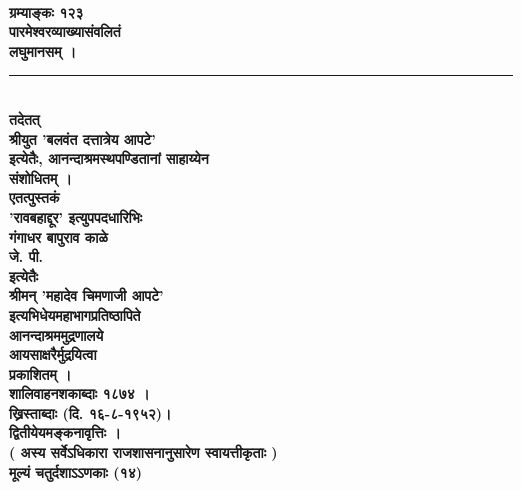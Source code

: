\documentclass[11pt, openany]{book}
\begin{document}
\thispagestyle{empty}
\begin{center}
\\
\vspace{2mm}
\textbf{ ग्रम्याङ्कः १२३}\\
\vspace{2mm}
\textbf{पारमेश्वरव्याख्यासंवलितं}\\
\vspace{3mm}
{\huge{\textbf{  लघुमानसम् ।}}}\\
\rule{0.3\linewidth}{1.0pt}\\
\vspace{2mm}
\textbf{तदेतत्}\\
\vspace{2mm}
\textbf{ श्रीयुत 'बलवंत दत्तात्रेय आपटे' }\\
\vspace{2mm}
\textbf{इत्येतैः, आनन्दाश्रमस्थपण्डितानां साहाय्येन}\\
\vspace{2mm}
\textbf{संशोधितम् ।}\\
\vspace{2mm}
\textbf{एतत्पुस्तकं}\\
\vspace{2mm}
\textbf{'रावबहाद्दूर' इत्युपपदधारिभिः}\\
\vspace{2mm}
\textbf{गंगाधर बापुराव काळे}\\
\vspace{2mm}
\textbf{जे. पी.}\\
\vspace{2mm}
\textbf{इत्येतैः}\\
\vspace{3mm}
{\huge{\textbf{श्रीमन् 'महादेव चिमणाजी आपटे'}}}\\
\vspace{2mm}
\textbf{इत्यभिधेयमहाभागप्रतिष्ठापिते}\\
\vspace{2mm}
{\huge{\textbf{आनन्दाश्रममुद्रणालये}}}\\
\vspace{2mm}
\textbf{आयसाक्षरैर्मुद्रयित्वा}\\
\vspace{2mm}
\textbf{प्रकाशितम् ।}\\
\vspace{2mm}
\textbf{शालिवाहनशकाब्दाः १८७४ ।}\\
\vspace{2mm}
\textbf{ख्रिस्ताब्दाः (दि. १६-८-१९५२)।}\\
\vspace{2mm}
\textbf{द्वितीयेयमङ्कनावृत्तिः ।}\\
 \vspace{2mm}
\textbf{( अस्य सर्वेऽधिकारा राजशासनानुसारेण स्वायत्तीकृताः   )}\\
\vspace{2mm}
\textbf{मूल्यं चतुर्दशाऽऽणकाः (१४)}
\end{center}
\end{document}
